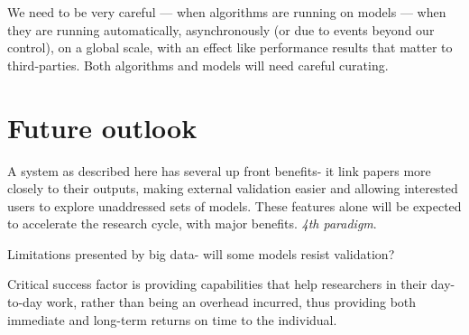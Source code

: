 \documentclass[conference]{IEEEtran}
\begin{document}
We need to be very careful --- when algorithms are running on models --- when
they are running automatically, asynchronously (or due to events beyond our
control), on a global scale, with an effect like performance results that
matter to third-parties. Both algorithms and  models will need careful
curating.





\section{Future outlook}

A system as described here has several up front benefits- it link papers 
more closely to their outputs, making external validation easier and 
allowing interested users to explore unaddressed sets of models. These 
features alone will be expected to accelerate the research cycle, with
major benefits. \emph{4th paradigm}.

Limitations presented by big data- will some models resist validation?

Critical success factor is providing capabilities that help researchers 
in their day-to-day work, rather than being an overhead incurred, thus 
providing both immediate and long-term returns on time to the individual.





\end{document}

